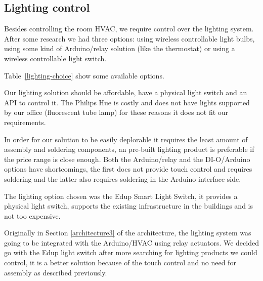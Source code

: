 \subsection{Lighting control}
Besides controlling the room \ac{HVAC}, we require control over the lighting system. After some research we had three options: using wireless controllable light bulbs, using some kind of Arduino/relay solution (like the thermostat) or using a wireless controllable light switch.

Table~\ref{lighting-choice} show some available options.

Our lighting solution should be affordable, have a physical light switch and an API to control it. The Philips Hue is costly and does not have lights supported by our office (fluorescent tube lamp) for these reasons it does not fit our requirements.

In order for our solution to be easily deplorable it requires the least amount of assembly and soldering components, an pre-built lighting product is preferable if the price range is close enough. Both the Arduino/relay and the DI-O/Arduino options have shortcomings, the first does not provide touch control and requires soldering and the latter also requires soldering in the Arduino interface side.

The lighting option chosen was the Edup Smart Light Switch, it provides a physical light switch, supports the existing infrastructure in the buildings and is not too expensive.


Originally in Section \ref{architecture3} of the architecture, the lighting system was going to be integrated with the Arduino/\ac{HVAC} using relay actuators. We decided go with the Edup light switch after more searching for lighting products we could control, it is a better solution because of the touch control and no need for assembly as described previously.

